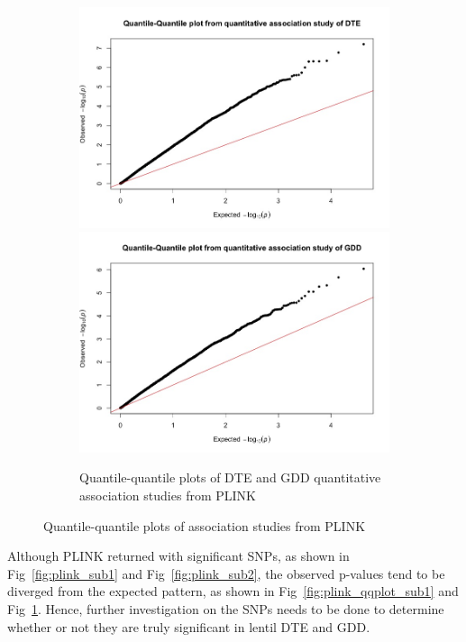 \documentclass{article}
\begin{document}
\begin{figure}[!htb]
\begin{subfigure}{\textwidth}
\centering
\includegraphics[scale=.25]{qqplot_qassoc_dte.jpeg}
\includegraphics[scale=.25]{qqplot_qassoc_gdd.jpeg}
\caption{Quantile-quantile plots of DTE and GDD quantitative association studies from PLINK}
\label{fig:plink_qqplot_sub2}
\end{subfigure}

\caption{Quantile-quantile plots of association studies from PLINK}
\label{fig:plink_qqplot}
\end{figure}

Although PLINK returned with significant SNPs, as shown in Fig~\ref{fig:plink_sub1} and Fig~\ref{fig:plink_sub2}, the observed p-values tend to be diverged from the expected pattern, as shown in Fig~\ref{fig:plink_qqplot_sub1} and Fig~\ref{fig:plink_qqplot_sub2}. Hence, further investigation on the SNPs needs to be done to determine whether or not they are truly significant in lentil DTE and GDD.
\end{document}
